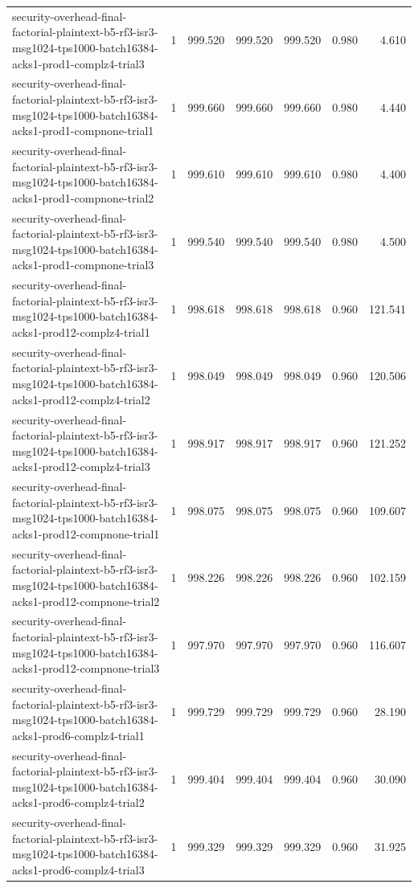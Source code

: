 \begin{tabular}{lrrrrrr}
security-overhead-final-factorial-plaintext-b5-rf3-isr3-msg1024-tps1000-batch16384-acks1-prod1-complz4-trial3 & 1 & 999.520 & 999.520 & 999.520 & 0.980 & 4.610 \\
security-overhead-final-factorial-plaintext-b5-rf3-isr3-msg1024-tps1000-batch16384-acks1-prod1-compnone-trial1 & 1 & 999.660 & 999.660 & 999.660 & 0.980 & 4.440 \\
security-overhead-final-factorial-plaintext-b5-rf3-isr3-msg1024-tps1000-batch16384-acks1-prod1-compnone-trial2 & 1 & 999.610 & 999.610 & 999.610 & 0.980 & 4.400 \\
security-overhead-final-factorial-plaintext-b5-rf3-isr3-msg1024-tps1000-batch16384-acks1-prod1-compnone-trial3 & 1 & 999.540 & 999.540 & 999.540 & 0.980 & 4.500 \\
security-overhead-final-factorial-plaintext-b5-rf3-isr3-msg1024-tps1000-batch16384-acks1-prod12-complz4-trial1 & 1 & 998.618 & 998.618 & 998.618 & 0.960 & 121.541 \\
security-overhead-final-factorial-plaintext-b5-rf3-isr3-msg1024-tps1000-batch16384-acks1-prod12-complz4-trial2 & 1 & 998.049 & 998.049 & 998.049 & 0.960 & 120.506 \\
security-overhead-final-factorial-plaintext-b5-rf3-isr3-msg1024-tps1000-batch16384-acks1-prod12-complz4-trial3 & 1 & 998.917 & 998.917 & 998.917 & 0.960 & 121.252 \\
security-overhead-final-factorial-plaintext-b5-rf3-isr3-msg1024-tps1000-batch16384-acks1-prod12-compnone-trial1 & 1 & 998.075 & 998.075 & 998.075 & 0.960 & 109.607 \\
security-overhead-final-factorial-plaintext-b5-rf3-isr3-msg1024-tps1000-batch16384-acks1-prod12-compnone-trial2 & 1 & 998.226 & 998.226 & 998.226 & 0.960 & 102.159 \\
security-overhead-final-factorial-plaintext-b5-rf3-isr3-msg1024-tps1000-batch16384-acks1-prod12-compnone-trial3 & 1 & 997.970 & 997.970 & 997.970 & 0.960 & 116.607 \\
security-overhead-final-factorial-plaintext-b5-rf3-isr3-msg1024-tps1000-batch16384-acks1-prod6-complz4-trial1 & 1 & 999.729 & 999.729 & 999.729 & 0.960 & 28.190 \\
security-overhead-final-factorial-plaintext-b5-rf3-isr3-msg1024-tps1000-batch16384-acks1-prod6-complz4-trial2 & 1 & 999.404 & 999.404 & 999.404 & 0.960 & 30.090 \\
security-overhead-final-factorial-plaintext-b5-rf3-isr3-msg1024-tps1000-batch16384-acks1-prod6-complz4-trial3 & 1 & 999.329 & 999.329 & 999.329 & 0.960 & 31.925 \\

\end{tabular}
